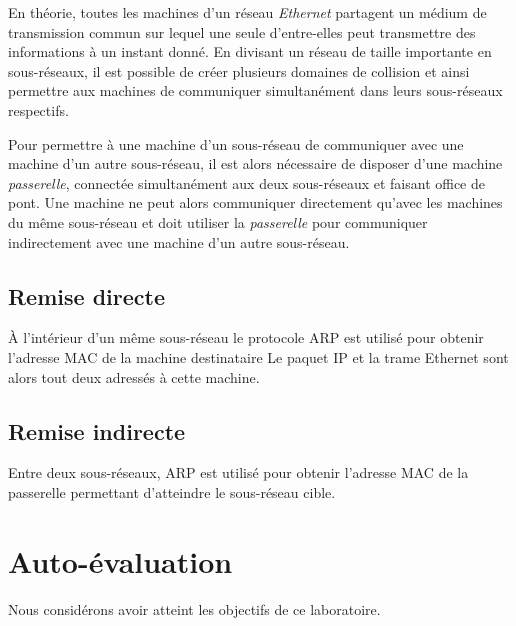 \documentclass[11pt,a4paper]{article}
\begin{document}
En théorie, toutes les machines d'un réseau \textit{Ethernet} partagent un médium de transmission commun sur lequel une seule d'entre-elles peut transmettre des informations à un instant donné. En divisant un réseau de taille importante en sous-réseaux, il est possible de créer plusieurs domaines de collision et ainsi permettre aux machines de communiquer simultanément dans leurs sous-réseaux respectifs.

Pour permettre à une machine d'un sous-réseau de communiquer avec une machine d'un autre sous-réseau, il est alors nécessaire de disposer d'une machine \textit{passerelle}, connectée simultanément aux deux sous-réseaux et faisant office de pont. Une machine ne peut alors communiquer directement qu'avec les machines du même sous-réseau et doit utiliser la \textit{passerelle} pour communiquer indirectement avec une machine d'un autre sous-réseau.

\subsection{Remise directe}

À l'intérieur d'un même sous-réseau le protocole ARP est utilisé pour obtenir l'adresse MAC de la machine destinataire Le paquet IP et la trame Ethernet sont alors tout deux adressés à cette machine.

\subsection{Remise indirecte}

Entre deux sous-réseaux, ARP est utilisé pour obtenir l'adresse MAC de la passerelle permettant d'atteindre le sous-réseau cible.

\section{Auto-évaluation}

Nous considérons avoir atteint les objectifs de ce laboratoire.
\end{document}
